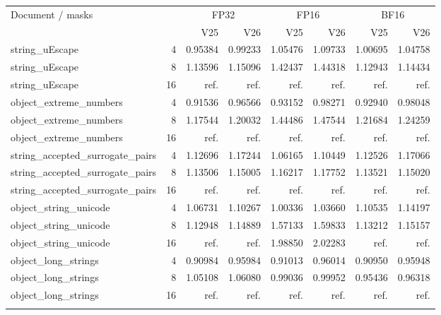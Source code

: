 \begin{tabular}{lrrrrrrr}
\toprule
Document / masks & & \multicolumn{2}{c}{FP32} & \multicolumn{2}{c}{FP16} & \multicolumn{2}{c}{BF16} \\
 & & V25 & V26 & V25 & V26 & V25 & V26 \\
\midrule
string\_uEscape & 4 & 0.95384 & 0.99233 & 1.05476 & 1.09733 & 1.00695 & 1.04758 \\
string\_uEscape & 8 & 1.13596 & 1.15096 & 1.42437 & 1.44318 & 1.12943 & 1.14434 \\
string\_uEscape & 16 & ref. & ref. & ref. & ref. & ref. & ref. \\
\addlinespace
object\_extreme\_numbers & 4 & 0.91536 & 0.96566 & 0.93152 & 0.98271 & 0.92940 & 0.98048 \\
object\_extreme\_numbers & 8 & 1.17544 & 1.20032 & 1.44486 & 1.47544 & 1.21684 & 1.24259 \\
object\_extreme\_numbers & 16 & ref. & ref. & ref. & ref. & ref. & ref. \\
\addlinespace
string\_accepted\_surrogate\_pairs & 4 & 1.12696 & 1.17244 & 1.06165 & 1.10449 & 1.12526 & 1.17066 \\
string\_accepted\_surrogate\_pairs & 8 & 1.13506 & 1.15005 & 1.16217 & 1.17752 & 1.13521 & 1.15020 \\
string\_accepted\_surrogate\_pairs & 16 & ref. & ref. & ref. & ref. & ref. & ref. \\
\addlinespace
object\_string\_unicode & 4 & 1.06731 & 1.10267 & 1.00336 & 1.03660 & 1.10535 & 1.14197 \\
object\_string\_unicode & 8 & 1.12948 & 1.14889 & 1.57133 & 1.59833 & 1.13212 & 1.15157 \\
object\_string\_unicode & 16 & ref. & ref. & 1.98850 & 2.02283 & ref. & ref. \\
\addlinespace
object\_long\_strings & 4 & 0.90984 & 0.95984 & 0.91013 & 0.96014 & 0.90950 & 0.95948 \\
object\_long\_strings & 8 & 1.05108 & 1.06080 & 0.99036 & 0.99952 & 0.95436 & 0.96318 \\
object\_long\_strings & 16 & ref. & ref. & ref. & ref. & ref. & ref. \\
\addlinespace
\bottomrule
\end{tabular}
